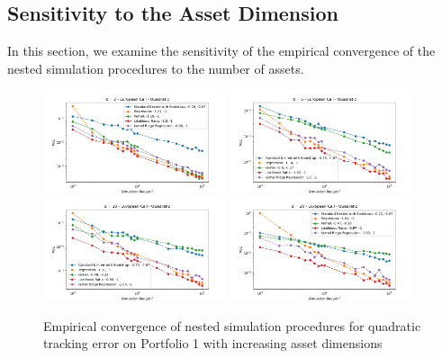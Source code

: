\documentclass{article}
\begin{document}
\subsection{Sensitivity to the Asset Dimension} \label{sec:sensitivity-dimension}
In this section, we examine the sensitivity of the empirical convergence of the nested simulation procedures to the number of assets.

\begin{figure}[ht!]
    \centering
    \includegraphics[width=0.48\textwidth]{./figures/convergence/4103.png}
    \includegraphics[width=0.48\textwidth]{./figures/convergence/3103.png}
    \includegraphics[width=0.48\textwidth]{./figures/convergence/2103.png}
    \includegraphics[width=0.48\textwidth]{./figures/convergence/1103.png}
    \caption{Empirical convergence of nested simulation procedures for quadratic tracking error on Portfolio 1 with increasing asset dimensions}
    \label{fig:x103} 
\end{figure}
\end{document}
